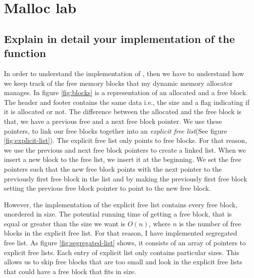 \section{Malloc lab}

\subsection{Explain in detail your implementation of the  function}
In order to understand the implementation of , then we have to understand how we keep track of the free memory blocks that my dynamic memory allocator manages. In figure \ref{fig:blocks} is a representation of an allocated and a free block. The header and footer contains the same data i.e., the size and a flag indicating if it is allocated or not. The difference between the allocated and the free block is that, we have a previous free and a next free block pointer. We use these pointers, to link our free blocks together into an \textit{explicit free list}(See figure \ref{fig:explicit-list}).
The explicit free list only points to free blocks. For that reason, we use the previous and next free block pointers to create a linked list. 
When we insert a new block to the free list, we insert it at the beginning. We set the free pointers such that the new free block points with the next pointer to the previously first free block in the list and by making the previously first free block setting the previous free block pointer to point to the new free block.

However, the implementation of the explicit free list contains every free block, unordered in size. The potential running time of getting a free block, that is equal or greater than the size we want is $O(n)$, where $n$ is the number of free blocks in the explicit free list. For that reason, I have implemented segregated free list. As figure \ref{fig:segregated-list} shows, it consists of an array of pointers to explicit free lists. Each entry of explicit list only contains particular sizes. 
This allows us to skip free blocks that are too small and look in the explicit free lists that could have a free block that fits in size.

